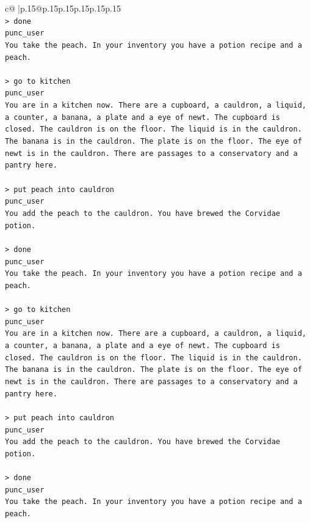 \documentclass{article}
\begin{document}
{\begin{supertabular}{c@{$\;$}|p{.15\linewidth}@{}p{.15\linewidth}p{.15\linewidth}p{.15\linewidth}p{.15\linewidth}p{.15\linewidth}}
{{{\\ 
\texttt{> done } \\
\texttt{punc\_user} \\
\texttt{You take the peach. In your inventory you have a potion recipe and a peach.} \\
\\ 
\texttt{> go to kitchen} \\
\texttt{punc\_user} \\
\texttt{You are in a kitchen now. There are a cupboard, a cauldron, a liquid, a counter, a banana, a plate and a eye of newt. The cupboard is closed. The cauldron is on the floor. The liquid is in the cauldron. The banana is in the cauldron. The plate is on the floor. The eye of newt is in the cauldron. There are passages to a conservatory and a pantry here.} \\
\\ 
\texttt{> put peach into cauldron} \\
\texttt{punc\_user} \\
\texttt{You add the peach to the cauldron. You have brewed the Corvidae potion.} \\
\\ 
\texttt{> done } \\
\texttt{punc\_user} \\
\texttt{You take the peach. In your inventory you have a potion recipe and a peach.} \\
\\ 
\texttt{> go to kitchen} \\
\texttt{punc\_user} \\
\texttt{You are in a kitchen now. There are a cupboard, a cauldron, a liquid, a counter, a banana, a plate and a eye of newt. The cupboard is closed. The cauldron is on the floor. The liquid is in the cauldron. The banana is in the cauldron. The plate is on the floor. The eye of newt is in the cauldron. There are passages to a conservatory and a pantry here.} \\
\\ 
\texttt{> put peach into cauldron} \\
\texttt{punc\_user} \\
\texttt{You add the peach to the cauldron. You have brewed the Corvidae potion.} \\
\\ 
\texttt{> done } \\
\texttt{punc\_user} \\
\texttt{You take the peach. In your inventory you have a potion recipe and a peach.} \\
}}}
\end{supertabular}}
\end{document}
